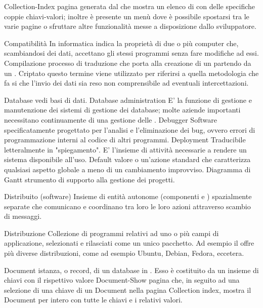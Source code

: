 \elemento
{Collection-Index} 
{pagina generata dal   che mostra un elenco di  con delle specifiche coppie chiavi-valori; inoltre è presente un menù dove è possibile spostarsi tra le varie pagine  o sfruttare altre funzionalità messe a disposizione dallo sviluppatore.}


\elemento
{Compatibilità}
{In informatica indica la proprietà di due o più computer che, scambiandosi dei dati, accettano gli stessi programmi senza fare modifiche ad essi.}
\elemento
{Compilazione} 
{processo di traduzione che porta alla creazione di un  partendo da un .}
\elemento
{Criptato} 
{questo termine viene utilizzato per riferirsi a quella metodologia che fa si che l'invio dei dati sia reso non comprensibile ad eventuali intercettazioni.}

\elemento
{Database} 
{vedi basi di dati.}
\elemento
{Database administration} 
{E' la funzione di gestione e manutenzione dei sistemi di gestione dei database; molte aziende importanti necessitano continuamente di una gestione delle .}
\elemento
{Debugger} 
{Software specificatamente progettato per l'analisi e l'eliminazione dei bug, ovvero errori di programmazione interni al codice di altri programmi.}
\elemento
{Deployment} 
{Traducibile letteralmente in "spiegamento". E' l'insieme di attività necessarie a rendere un sistema  disponibile all'uso.}
\elemento
{Default} 
{valore o un'azione standard che caratterizza qualsiasi aspetto globale a meno di un cambiamento improvviso.}
\elemento
{Diagramma di Gantt}
{strumento di supporto alla gestione dei progetti.} 

\elemento
{Distribuito (software)}
{Insieme di entità autonome (componenti  e ) spazialmente separate che comunicano e coordinano tra loro le loro azioni attraverso scambio di messaggi.}

\elemento
{Distribuzione} 
{Collezione di programmi relativi ad uno o più campi di applicazione, selezionati e rilasciati come un unico pacchetto. Ad esempio il  offre più diverse distribuzioni, come ad esempio Ubuntu, Debian, Fedora, eccetera.}

\elemento
{Document}
{istanza, o record, di un database in . Esso è costituito da un insieme di chiavi con il rispettivo valore}
\elemento
{Document-Show} 
{pagina che, in seguito ad una selezione di una chiave di un Document nella pagina Collection index, mostra il Document per intero con tutte le chiavi e i relativi valori.}

